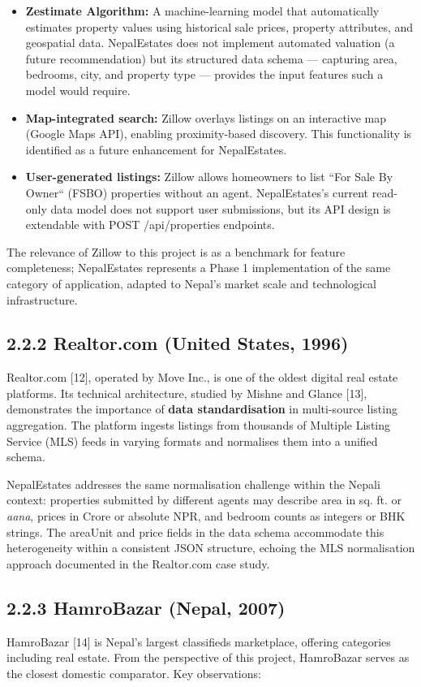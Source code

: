 \documentclass[12pt,a4paper]{report}
\begin{document}
\begin{itemize}
  \item \textbullet{} \textbf{Zestimate Algorithm:} A machine-learning model that automatically estimates property values using historical sale prices, property attributes, and geospatial data. NepalEstates does not implement automated valuation (a future recommendation) but its structured data schema --- capturing area, bedrooms, city, and property type --- provides the input features such a model would require.
  \item \textbullet{} \textbf{Map-integrated search:} Zillow overlays listings on an interactive map (Google Maps API), enabling proximity-based discovery. This functionality is identified as a future enhancement for NepalEstates.
  \item \textbullet{} \textbf{User-generated listings:} Zillow allows homeowners to list ``For Sale By Owner`` (FSBO) properties without an agent. NepalEstates's current read-only data model does not support user submissions, but its API design is extendable with POST /api/properties endpoints.
\end{itemize}
The relevance of Zillow to this project is as a benchmark for feature completeness; NepalEstates represents a Phase 1 implementation of the same category of application, adapted to Nepal's market scale and technological infrastructure.

\subsection{2.2.2 Realtor.com (United States, 1996)}
Realtor.com [12], operated by Move Inc., is one of the oldest digital real estate platforms. Its technical architecture, studied by Mishne and Glance [13], demonstrates the importance of \textbf{data standardisation} in multi-source listing aggregation. The platform ingests listings from thousands of Multiple Listing Service (MLS) feeds in varying formats and normalises them into a unified schema.

NepalEstates addresses the same normalisation challenge within the Nepali context: properties submitted by different agents may describe area in sq. ft. or \textit{aana}, prices in Crore or absolute NPR, and bedroom counts as integers or BHK strings. The areaUnit and price fields in the data schema accommodate this heterogeneity within a consistent JSON structure, echoing the MLS normalisation approach documented in the Realtor.com case study.

\subsection{2.2.3 HamroBazar (Nepal, 2007)}
HamroBazar [14] is Nepal's largest classifieds marketplace, offering categories including real estate. From the perspective of this project, HamroBazar serves as the closest domestic comparator. Key observations:
\end{document}
